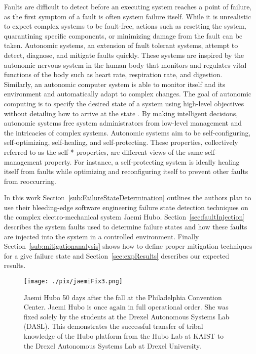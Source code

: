Faults are difficult to detect before an executing system reaches a point of
failure, as the first symptom of a fault is often system failure itself. While
it is unrealistic to expect complex systems to be fault-free, actions such as
resetting the system, quarantining specific components, or minimizing damage
from the fault can be taken. Autonomic systems, an extension of fault tolerant
systems, attempt to detect, diagnose, and mitigate faults quickly. These
systems are inspired by the autonomic nervous system in the human body that
monitors and regulates vital functions of the body such as heart rate,
respiration rate, and digestion. Similarly, an autonomic computer system is
able to monitor itself and its environment and automatically adapt to complex
changes. The goal of autonomic computing is to specify the desired state of a
system using high-level objectives without detailing how to arrive at the state
\cite{1160055,4061119,1301340}. By making intelligent decisions, autonomic
systems free system administrators from low-level management and the
intricacies of complex systems. Autonomic systems aim to be self-configuring,
self-optimizing, self-healing, and self-protecting. These properties,
collectively referred to as the self-* properties, are different views of the
same self-man\-age\-ment property. For instance, a self-protecting system is
ideally healing itself from faults while optimizing and reconfiguring itself to
prevent other faults from reoccurring.


In this work Section~\ref{sub:FailureStateDetermination} outlines the authors
plan to use their bleeding-edge software engineering failure state detection
techniques on the complex electro-mechanical system Jaemi Hubo.
Section~\ref{sec:faultInjection} describes the system faults used to determine failure
states and how these faults are injected into the system in a controlled environment.  Finally
Section~\ref{sub:mitigationanalysis} shows how to define proper mitigation
techniques for a give failure state and Section~\ref{sec:expResults} describes
our expected results.

\begin{figure}[thpb]
  \centering
\texttt{[image: ./pix/jaemiFix3.png]}
  \caption{Jaemi Hubo 50 days after the fall at the Philadelphia Convention Center.  
  Jaemi Hubo is once again in full operational order.  She was fixed solely by the students at 
  the Drexel Autonomous Systems Lab (DASL).  This demonstrates the successful transfer of tribal knowledge 
  of the Hubo platform from the Hubo Lab at KAIST to the Drexel Autonomous Systems Lab at Drexel University.
	}
  \label{fig:huboFix}
\end{figure}